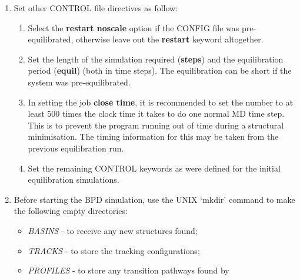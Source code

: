 \begin{enumerate}
\begin{enumerate}
      {\bf catch\_radius} 3.0.
\item Set the NEB spring constant (in specified energy units per $\AA^2$). 
       e.g.  1000.0 (for DL\_POLY units).
\item Select a minimisation option.  e.g. 
       {\em key tol}.\newline 
      Where {\em key} is one of {\em force, energy, position} and {\em
      tol} is the convergence tolerance.
      (The recommended choice is {\em force} with a tolerance 
      of 1.0 in DL\_POLY units.)
\item Close the BPD definition with the directive \newline
      {\bf endbpd}
\end{enumerate}
\item Set other CONTROL file directives as follow:
\begin{enumerate}
\item Select the {\bf restart noscale} option if the CONFIG file was
      pre-equilibrated, otherwise leave out the {\bf restart} keyword 
      altogether.
\item Set the length of the simulation required ({\bf steps}) and the 
      equilibration period ({\bf equil}) (both in time steps). The
      equilibration can be short if the system was pre-equilibrated.
\item In setting the job {\bf close time}, it is
      recommended to set the number to at least 500 times the clock
      time it takes to do one normal MD time step. This is to prevent
      the program running out of time during a structural
      minimisation. The timing information for this may be taken from
      the previous equilibration run.
\item Set the remaining CONTROL keywords as were defined for the initial
      equilibration simulations.
\end{enumerate}
\item Before starting the BPD simulation, use the UNIX `mkdir' command to
      make the following empty directories: 
\begin{itemize}
   \item {\em BASINS} - to receive any new structures found;
   \item {\em TRACKS} - to store the tracking configurations;
   \item {\em PROFILES} - to store any transition pathways found by

\end{itemize}
\end{enumerate}
